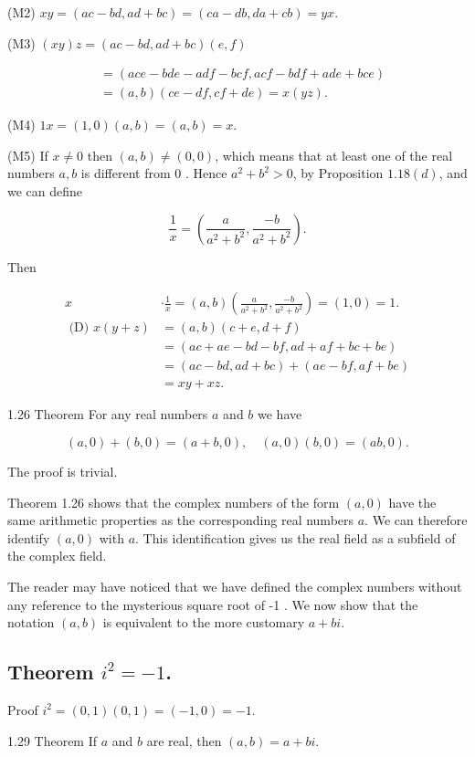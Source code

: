 \documentclass[10pt]{article}
\begin{document}
(M2) $x y=(a c-b d, a d+b c)=(c a-d b, d a+c b)=y x$.

(M3) $(x y) z=(a c-b d, a d+b c)(e, f)$

$$
\begin{aligned}
& =(a c e-b d e-a d f-b c f, a c f-b d f+a d e+b c e) \\
& =(a, b)(c e-d f, c f+d e)=x(y z) .
\end{aligned}
$$

(M4) $1 x=(1,0)(a, b)=(a, b)=x$.

(M5) If $x \neq 0$ then $(a, b) \neq(0,0)$, which means that at least one of the real numbers $a, b$ is different from 0 . Hence $a^{2}+b^{2}>0$, by Proposition $1.18(d)$, and we can define

$$
\frac{1}{x}=\left(\frac{a}{a^{2}+b^{2}}, \frac{-b}{a^{2}+b^{2}}\right) .
$$

Then

$$
\begin{aligned}
x & \cdot \frac{1}{x}=(a, b)\left(\frac{a}{a^{2}+b^{2}}, \frac{-b}{a^{2}+b^{2}}\right)=(1,0)=1 . \\
\text { (D) } x(y+z) & =(a, b)(c+e, d+f) \\
& =(a c+a e-b d-b f, a d+a f+b c+b e) \\
& =(a c-b d, a d+b c)+(a e-b f, a f+b e) \\
& =x y+x z .
\end{aligned}
$$

1.26 Theorem For any real numbers $a$ and $b$ we have

$$
(a, 0)+(b, 0)=(a+b, 0), \quad(a, 0)(b, 0)=(a b, 0) .
$$

The proof is trivial.

Theorem 1.26 shows that the complex numbers of the form $(a, 0)$ have the same arithmetic properties as the corresponding real numbers $a$. We can therefore identify $(a, 0)$ with $a$. This identification gives us the real field as a subfield of the complex field.

The reader may have noticed that we have defined the complex numbers without any reference to the mysterious square root of -1 . We now show that the notation $(a, b)$ is equivalent to the more customary $a+b i$.

\subsection{Theorem $i^{2}=-1$.}
Proof $i^{2}=(0,1)(0,1)=(-1,0)=-1$.

1.29 Theorem If $a$ and $b$ are real, then $(a, b)=a+b i$.
\end{document}
